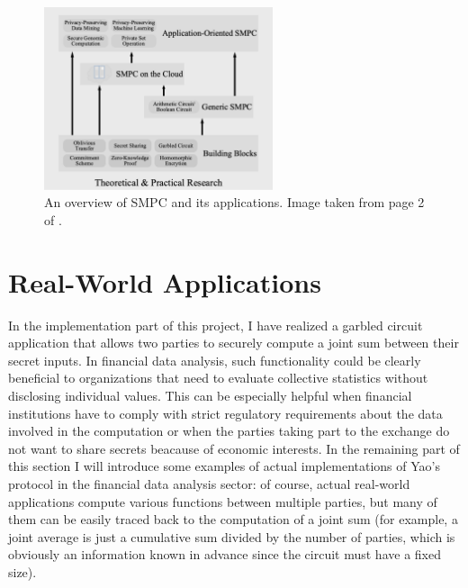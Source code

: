 \documentclass[12pt]{article}
\begin{document}
\begin{figure}[h]
    \centering
    \includegraphics[width=0.6\textwidth]{practicalapplications.png}
    \caption{An overview of SMPC and its applications. Image taken from page 2 of \cite{Applications}.}\label{fig:applications}
\end{figure}

\section{Real-World Applications}\label{sec:applications}

In the implementation part of this project, I have realized a garbled circuit application that allows two parties to securely compute a joint sum between their secret inputs. In financial data analysis, such functionality could be clearly beneficial to organizations that need to evaluate collective statistics without disclosing individual values. This can be especially helpful when financial institutions have to comply with strict regulatory requirements about the data involved in the computation or when the parties taking part to the exchange do not want to share secrets beacause of economic interests. In the remaining part of this section I will introduce some examples of actual implementations of Yao's protocol in the financial data analysis sector: of course, actual real-world applications compute various functions between multiple parties, but many of them can be easily traced back to the computation of a joint sum (for example, a joint average is just a cumulative sum divided by the number of parties, which is obviously an information known in advance since the circuit must have a fixed size).
\end{document}
